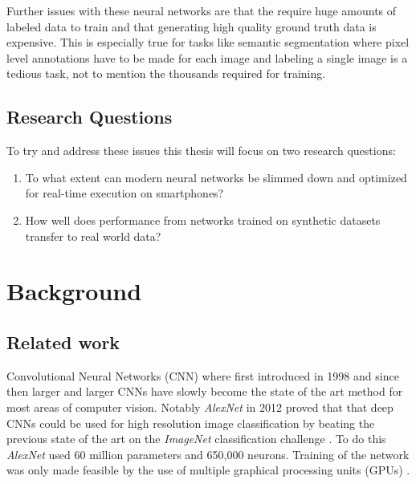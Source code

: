 \documentclass{kththesis}
\newcommand{\bibentry}[1]{\parencite{#1}}
\begin{document}
Further issues with these neural networks are that the require huge amounts of
labeled data to train and that generating high quality ground truth data is
expensive. This is especially true for tasks like semantic segmentation
where pixel level annotations have to be made for each image and labeling a
single image is a tedious task, not to mention the thousands required for
training. 

\section{Research Questions}
To try and address these issues this thesis will focus on two research questions:
\begin{enumerate}
\item To what extent can modern neural networks be slimmed down and optimized for
  real-time execution on smartphones?
\item How well does performance from networks trained on synthetic datasets
  transfer to real world data? 
\end{enumerate}
  
\chapter{Background}
\section{Related work}
Convolutional Neural Networks (CNN) where first introduced in 1998
\bibentry{lecun1998gradient} and since then larger and larger CNNs have slowly
become the state of the art method for most areas of computer vision. Notably
\emph{AlexNet} \bibentry{krizhevsky2012imagenet} in 2012 proved that that deep
CNNs could be used for high resolution image classification by beating the
previous state of the art \bibentry{sanchez2011high} on the \emph{ImageNet}
classification challenge \bibentry{deng2009imagenet}. To do this \emph{AlexNet}
used 60 million parameters and 650,000 neurons. Training of the network was
only made feasible by the use of multiple graphical processing units (GPUs)
\bibentry{krizhevsky2012imagenet}.
\end{document}
